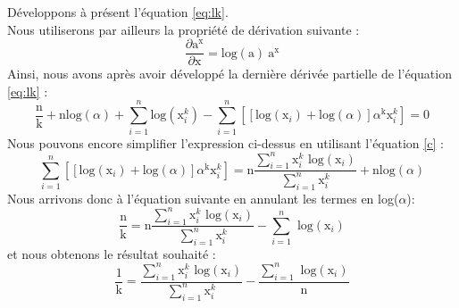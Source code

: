 Développons à présent l'équation \ref{eq:lk}. \\ 
Nous utiliserons par ailleurs la propriété de dérivation suivante :
\begin{equation}
\dfrac{\partial \mbox{a}^{\mbox{x}}}{\partial \mbox{x}} = \mbox{log}(\mbox{a})~\mbox{a}^{\mbox{x}}
\end{equation}
Ainsi, nous avons après avoir développé la dernière dérivée partielle de l'équation \ref{eq:lk} :
\begin{equation}
 \dfrac{\mbox{n}}{\mbox{k}} + \mbox{n}\mbox{log}(\alpha) + \sum\limits_{i=1}^{n} \mbox{log}(\mbox{x}^{k}_{i}) -  \sum\limits_{i=1}^{n}  \left[ \left[ \mbox{log}(\mbox{x}_{i}) + \mbox{log}(\alpha) \right] \alpha^{\mbox{k}} \mbox{x}^{k}_{i} \right] = 0
\end{equation}
Nous pouvons encore simplifier l'expression ci-dessus en utilisant l'équation \ref{c} :
\begin{equation}
\sum\limits_{i=1}^{n}  \left[ \left[ \mbox{log}(\mbox{x}_{i}) + \mbox{log}(\alpha) \right] \alpha^{\mbox{k}} \mbox{x}^{k}_{i} \right] = \mbox{n} \dfrac{\sum\limits_{i=1}^{n} \mbox{x}^{k}_{i} \mbox{~log}(\mbox{x}_{i})}{\sum\limits_{i=1}^{n} \mbox{x}^{k}_{i}} + \mbox{n}\mbox{log}(\alpha)
\end{equation}
Nous arrivons donc à l'équation suivante en annulant les termes en log($\alpha$):
\begin{equation}
\dfrac{\mbox{n}}{\mbox{k}} = \mbox{n} \dfrac{\sum\limits_{i=1}^{n} \mbox{x}^{k}_{i} \mbox{~log}(\mbox{x}_{i})}{\sum\limits_{i=1}^{n} \mbox{x}^{k}_{i}} - \sum\limits_{i=1}^{n} \mbox{~log}(\mbox{x}_{i})
\end{equation}
et nous obtenons le résultat souhaité :
\begin{equation}
\dfrac{1}{\mbox{k}} = \dfrac{\sum\limits_{i=1}^{n} \mbox{x}^{k}_{i} \mbox{~log}(\mbox{x}_{i})}{\sum\limits_{i=1}^{n} \mbox{x}^{k}_{i}} - \dfrac{\sum\limits_{i=1}^{n} \mbox{~log}(\mbox{x}_{i})}{\mbox{n}}
\end{equation}

